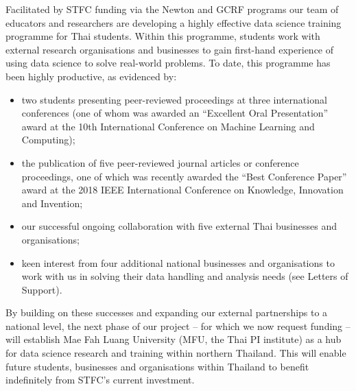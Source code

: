 \documentclass[11pt]{article}
\begin{document}
  \vspace{2mm}
  \noindent
  Facilitated by STFC funding via the Newton and GCRF programs our team of educators and researchers are developing a highly effective data science training programme for Thai students. Within this programme, students work with external research organisations and businesses to gain first-hand experience of using data science to solve real-world problems. To date, this programme has been highly productive, as evidenced by:
  \begin{itemize}[leftmargin=6mm,itemsep=-3pt,topsep=1pt]
    \item two students presenting peer-reviewed proceedings at three international conferences (one of whom was awarded an ``Excellent Oral Presentation'' award at the 10th International Conference on Machine Learning and Computing);
    \item the publication of five peer-reviewed journal articles or conference proceedings, one of which was recently awarded the ``Best Conference Paper'' award at the 2018 IEEE International Conference on Knowledge, Innovation and Invention;
    \item our successful ongoing collaboration with five external Thai businesses and organisations;
    \item keen interest from four additional national businesses and organisations to work with us in solving their data handling and analysis needs (see Letters of Support).
  \end{itemize}
  By building on these successes and expanding our external partnerships to a national level, the next phase of our project -- for which we now request funding -- will establish Mae Fah Luang University (MFU, the Thai PI institute) as a hub for data science research and training within northern Thailand. This will enable future students, businesses and organisations within Thailand to benefit indefinitely from STFC's current investment.
  
\end{document}

